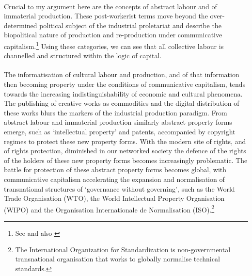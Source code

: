 \paragraph{}Crucial to my argument here are the concepts of abstract labour and of immaterial production. These post-workerist terms move beyond the over-determined political subject of the industrial proletariat and describe the biopolitical nature of production and re-production under communicative capitalism.\footnote{See \cite[Chapter 3 \textit{Free Labour}]{Terranova:2004ly} and also \cite{Wright:2005wb}} Using these categories, we can see that all collective labour is channelled and structured within the logic of capital.

\paragraph{}The informatisation of cultural labour and production, and of that information then becoming property under the conditions of communicative capitalism, tends towards the increasing indistinguishability of economic and cultural phenomena. The publishing of creative works as commodities and the digital distribution of these works blurs the markers of the industrial production paradigm. From abstract labour and immaterial production similarly abstract property forms emerge, such as `intellectual property' and patents, accompanied by copyright regimes to protect these new property forms. With the modern site of rights, and of rights protection, diminished in our networked society the defence of the rights of the holders of these new property forms becomes increasingly problematic. The battle for protection of these abstract property forms becomes global, with communicative capitalism accelerating the expansion and normalisation of transnational structures of `governance without governing', such as the World Trade Organisation (WTO), the World Intellectual Property Organisation (WIPO) and the Organisation Internationale de Normalisation (ISO).\footnote{The International Organization for Standardization is non-governmental transnational organisation that works to globally normalise technical standards.}

